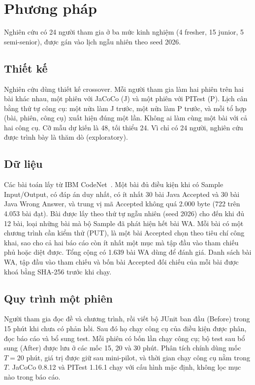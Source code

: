\section{Phương pháp}
\label{sec:methods}

Nghiên cứu có 24 người tham gia ở ba mức kinh nghiệm (4 fresher, 15 junior, 5 semi-senior), được gán vào lịch ngẫu nhiên theo seed 2026.

\subsection{Thiết kế}
Nghiên cứu dùng thiết kế crossover. Mỗi người tham gia làm hai phiên trên hai bài khác nhau, một phiên với JaCoCo (J) và một phiên với PITest (P). Lịch cân bằng thứ tự công cụ: một nửa làm J trước, một nửa làm P trước, và mỗi tổ hợp (bài, phiên, công cụ) xuất hiện đúng một lần. Không ai làm cùng một bài với cả hai công cụ. Cỡ mẫu dự kiến là 48, tối thiểu 24. Vì chỉ có 24 người, nghiên cứu được trình bày là thăm dò (exploratory).

\subsection{Dữ liệu}
Các bài toán lấy từ IBM CodeNet~\cite{puri2021}. Một bài đủ điều kiện khi có Sample Input/Output, có đáp án duy nhất, có ít nhất 30 bài Java Accepted và 30 bài Java Wrong Answer, và trung vị mã Accepted không quá 2.000 byte (722 trên 4.053 bài đạt). Bài được lấy theo thứ tự ngẫu nhiên (seed 2026) cho đến khi đủ 12 bài, loại những bài mà bộ Sample đã phát hiện hết bài WA. Mỗi bài có một chương trình cần kiểm thử (PUT), là một bài Accepted chọn theo tiêu chí công khai, sao cho cả hai báo cáo còn ít nhất một mục mà tập đầu vào tham chiếu phủ hoặc diệt được. Tổng cộng có 1.639 bài WA dùng để đánh giá. Danh sách bài WA, tập đầu vào tham chiếu và bốn bài Accepted đối chiếu của mỗi bài được khoá bằng SHA-256 trước khi chạy.

\subsection{Quy trình một phiên}
Người tham gia đọc đề và chương trình, rồi viết bộ JUnit ban đầu (Before) trong 15 phút khi chưa có phản hồi. Sau đó họ chạy công cụ của điều kiện được phân, đọc báo cáo và bổ sung test. Mỗi phiên có bốn lần chạy công cụ; bộ test sau bổ sung (After) được lưu ở các mốc 15, 20 và 30 phút. Phân tích chính dùng mốc $T = 20$ phút, giá trị được giữ sau mini-pilot, và thời gian chạy công cụ nằm trong $T$. JaCoCo 0.8.12 và PITest 1.16.1 chạy với cấu hình mặc định, không lọc mục nào trong báo cáo.


